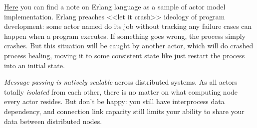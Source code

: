 \clearpage{}\secdown


\href{http://www.brianstorti.com/the-actor-model/}{Here} you can find a note on
Erlang language as a sample of actor model implementation. Erlang preaches <<let
it crash>> ideology of program development: some actor named  do
its job without tracking any failure cases can happen when a program executes.
If something goes wrong, the process simply crashes. But this situation will be
caught by another  actor, which will do crashed process
healing, moving it to some consistent state like just restart the process into
an initial state.
 

\emph{Message passing is natively scalable} across distributed systems. As all
actors totally \emph{isolated} from each other, there is no matter on what
computing node every actor resides. But don't be happy: you still have interprocess data dependency, and
connection link capacity still limits your ability to share your data between
distributed nodes.

\secup